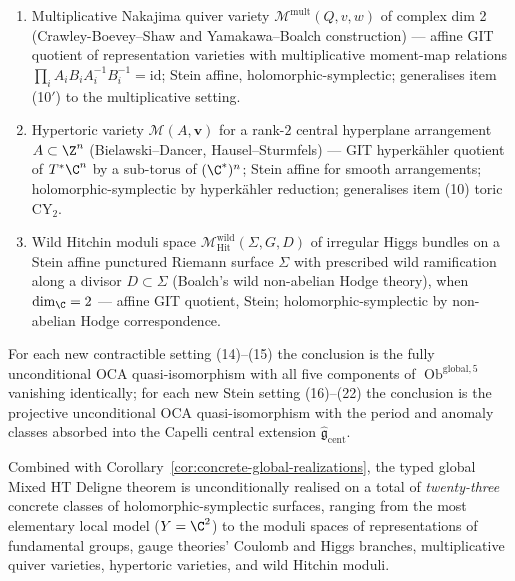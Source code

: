 \begin{cor}
\begin{enumerate}[label=\textup{(\arabic*)},resume]
        Higgs branch of $U(1)$ with two fundamental hypermultiplets
        (giving $\widetilde{\C^2/\Z_2}$ by 3d mirror symmetry, an
        item (9$'$) instance) and the Higgs branch of $U(2)$ with
        three fundamental hypermultiplets (a genuine dim-2 Higgs
        branch distinct from items (9$'$)--(10$'$)).
  \item Multiplicative Nakajima quiver variety
        \(\mathcal M^{\mathrm{mult}}(Q,v,w)\) of complex dim 2
        (Crawley-Boevey--Shaw and Yamakawa--Boalch construction)
        --- affine GIT quotient of representation varieties with
        multiplicative moment-map relations
        $\prod_iA_iB_iA_i^{-1}B_i^{-1}=\mathrm{id}$; Stein affine,
        holomorphic-symplectic; generalises item (10$'$) to the
        multiplicative setting.
  \item Hypertoric variety
        \(\mathcal M(A,\mathbf v)\) for a rank-$2$ central hyperplane
        arrangement $A\subset\Z^n$ (Bielawski--Dancer,
        Hausel--Sturmfels) --- GIT hyperkähler quotient of
        $T^*\C^n$ by a sub-torus of $(\C^*)^n$; Stein affine for
        smooth arrangements; holomorphic-symplectic by hyperkähler
        reduction; generalises item (10) toric CY$_2$.
  \item Wild Hitchin moduli space
        \(\mathcal M_{\mathrm{Hit}}^{\mathrm{wild}}(\Sigma,G,D)\)
        of irregular Higgs bundles on a Stein affine punctured
        Riemann surface $\Sigma$ with prescribed wild ramification
        along a divisor $D\subset\Sigma$ (Boalch's wild non-abelian
        Hodge theory), when $\dim_\C=2$ --- affine GIT quotient,
        Stein; holomorphic-symplectic by non-abelian Hodge
        correspondence.
\end{enumerate}

\medskip
For each new contractible setting (14)--(15) the conclusion is the
fully unconditional OCA quasi-isomorphism with all five components
of $\operatorname{Ob}^{\mathrm{global,5}}$ vanishing identically; for
each new Stein setting (16)--(22) the conclusion is the projective
unconditional OCA quasi-isomorphism with the period and anomaly
classes absorbed into the Capelli central extension
$\widehat{\mathfrak g}_{\mathrm{cent}}$.

Combined with Corollary~\ref{cor:concrete-global-realizations}, the
typed global Mixed HT Deligne theorem is unconditionally realised on
a total of \emph{twenty-three} concrete classes of holomorphic-symplectic
surfaces, ranging from the most elementary local model
($Y=\C^2$) to the moduli spaces of representations of fundamental
groups, gauge theories' Coulomb and Higgs branches, multiplicative
quiver varieties, hypertoric varieties, and wild Hitchin moduli.
\end{cor}

